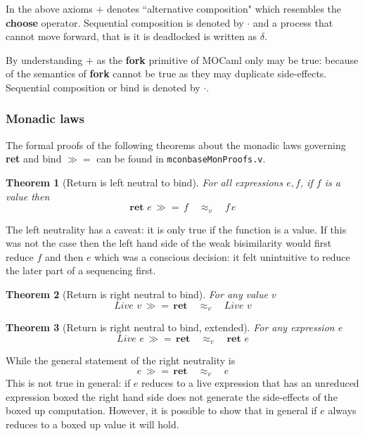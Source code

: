\documentclass[12pt,twoside,notitlepage]{report}
\theoremstyle{plain}%
\newtheorem{thm}{Theorem}[section]
\theoremstyle{definition}
\theoremstyle{remark}
\begin{document}
In the above axioms $ + $ denotes ``alternative composition" which resembles the \textbf{choose} operator. Sequential composition is denoted by $ \cdot $ and a process that cannot move forward, that is it is deadlocked is written as $ \delta $. 

By understanding $ + $ as the \textbf{fork} primitive of MOCaml only  may be true: because of the semantics of \textbf{fork}  cannot be true as they may duplicate side-effects. Sequential composition or bind is denoted by $ \cdot $.

\subsubsection{Monadic laws}
The formal proofs of the following theorems about the monadic laws governing \textbf{ret} and bind $ \gg= $ can be found in \verb|mconbaseMonProofs.v|.

\begin{thm}[Return is left neutral to bind]
For all expressions $ e, f $, if $ f $ is a value then
\[ \textbf{ret } e\,\gg=\, f\quad \approx_v \quad f\,e \]
\end{thm}

The left neutrality has a caveat: it is only true if the function is a value. If this was not the case then the left hand side of the weak bisimilarity would first reduce $ f $ and then $ e $ which was a conscious decision: it felt unintuitive to reduce the later part of a sequencing first. 

\begin{thm}[Return is right neutral to bind]
For any value $ v$
\[  \textit{Live }v\,\gg=\, \textbf{ret}\quad \approx_v \quad \textit{Live }v \]
\end{thm}

\begin{thm}[Return is right neutral to bind, extended]
For any expression $ e$
\[  \textit{Live }e\,\gg=\, \textbf{ret}\quad \approx_v \quad \textbf{ret } e \]
\end{thm}

While the general statement of the right neutrality is 
\[  e\,\gg=\, \textbf{ret}\quad \approx_v \quad e \]
This is not true in general: if $ e $ reduces to a live expression that has an unreduced expression boxed the right hand side does not generate the side-effects of the boxed up computation. However, it is possible to show that in general if $ e $ always reduces to a boxed up value it will hold.
\end{document}
